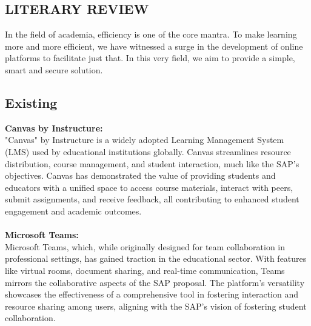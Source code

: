 \begin{center}
\section{LITERARY REVIEW}
\end{center}
In the field of academia, efficiency is one of the core mantra. To make learning more and more efficient, we have witnessed a surge in the development of online platforms to facilitate just that. In this very field, we aim to provide a simple, smart and secure solution.
\vspace{0.2in}

\subsection{Existing}
\textbf{Canvas by Instructure:}\\
 "Canvas" by Instructure is a widely adopted Learning Management System (LMS) used by educational institutions globally. Canvas streamlines resource distribution, course management, and student interaction, much like the SAP's objectives. Canvas has demonstrated the value of providing students and educators with a unified space to access course materials, interact with peers, submit assignments, and receive feedback, all contributing to enhanced student engagement and academic outcomes.\cite{canvas}\\
 \\
 \textbf{Microsoft Teams:}\\
 Microsoft Teams, which, while originally designed for team collaboration in professional settings, has gained traction in the educational sector. With features like virtual rooms, document sharing, and real-time communication, Teams mirrors the collaborative aspects of the SAP proposal. The platform's versatility showcases the effectiveness of a comprehensive tool in fostering interaction and resource sharing among users, aligning with the SAP's vision of fostering student collaboration.\cite{microsoft}
 \newpage

